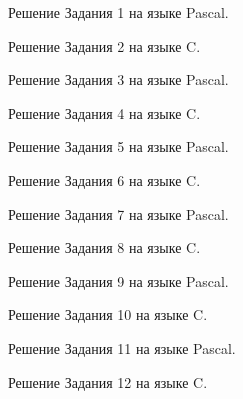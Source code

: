 \documentclass[oneside,a4paper,14pt]{extarticle}
\begin{document}

\begin{center}
	Решение Задания 1 на языке Pascal.
\end{center}
\pagebreak

\begin{center}
	Решение Задания 2 на языке C.
\end{center}

\begin{center}
	Решение Задания 3 на языке Pascal.
\end{center}
\pagebreak

\begin{center}
	Решение Задания 4 на языке C.
\end{center}

\begin{center}
	Решение Задания 5 на языке Pascal.
\end{center}

\begin{center}
	Решение Задания 6 на языке C.
\end{center}

\begin{center}
	Решение Задания 7 на языке Pascal.
\end{center}
\pagebreak

\begin{center}
	Решение Задания 8 на языке C.
\end{center}
\pagebreak

\begin{center}
	Решение Задания 9 на языке Pascal.
\end{center}
\pagebreak

\begin{center}
	Решение Задания 10 на языке C.
\end{center}

\begin{center}
	Решение Задания 11 на языке Pascal.
\end{center}

\begin{center}
	Решение Задания 12 на языке C.
\end{center}
\end{document}
